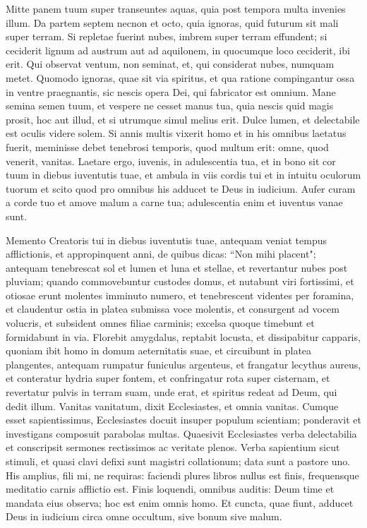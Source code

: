 \begin{biblechapter}  
\verse Mitte panem tuum super transeuntes aquas, quia post tempora multa invenies illum. 
\verse Da partem septem necnon et octo, quia ignoras, quid futurum sit mali super terram. 
\verse Si repletae fuerint nubes, imbrem super terram effundent; si ceciderit lignum ad austrum aut ad aquilonem, in quocumque loco ceciderit, ibi erit. 
\verse Qui observat ventum, non seminat, et, qui considerat nubes, numquam metet. 
\verse Quomodo ignoras, quae sit via spiritus, et qua ratione compingantur ossa in ventre praegnantis, sic nescis opera Dei, qui fabricator est omnium. 
\verse Mane semina semen tuum, et vespere ne cesset manus tua, quia nescis quid magis prosit, hoc aut illud, et si utrumque simul melius erit. 
\verse Dulce lumen, et delectabile est oculis videre solem. 
\verse Si annis multis vixerit homo et in his omnibus laetatus fuerit, meminisse debet tenebrosi temporis, quod multum erit: omne, quod venerit, vanitas. 
\verse Laetare ergo, iuvenis, in adulescentia tua, et in bono sit cor tuum in diebus iuventutis tuae, et ambula in viis cordis tui et in intuitu oculorum tuorum et scito quod pro omnibus his adducet te Deus in iudicium. 
\verse Aufer curam a corde tuo et amove malum a carne tua; adulescentia enim et iuventus vanae sunt. 
\end{biblechapter}

\begin{biblechapter}  
\verse Memento Creatoris tui in diebus iuventutis tuae, antequam veniat tempus afflictionis, et appropinquent anni, de quibus dicas: “Non mihi placent"; 
\verse antequam tenebrescat sol et lumen et luna et stellae, et revertantur nubes post pluviam; 
\verse quando commovebuntur custodes domus, et nutabunt viri fortissimi, et otiosae erunt molentes imminuto numero, et tenebrescent videntes per foramina, 
\verse et claudentur ostia in platea submissa voce molentis, et consurgent ad vocem volucris, et subsident omnes filiae carminis; 
\verse excelsa quoque timebunt et formidabunt in via. Florebit amygdalus, reptabit locusta, et dissipabitur capparis, quoniam ibit homo in domum aeternitatis suae, et circuibunt in platea plangentes, 
\verse antequam rumpatur funiculus argenteus, et frangatur lecythus aureus, et conteratur hydria super fontem, et confringatur rota super cisternam, 
\verse et revertatur pulvis in terram suam, unde erat, et spiritus redeat ad Deum, qui dedit illum. 
\verse Vanitas vanitatum, dixit Ecclesiastes, et omnia vanitas. 
\verse Cumque esset sapientissimus, Ecclesiastes docuit insuper populum scientiam; ponderavit et investigans composuit parabolas multas. 
\verse Quaesivit Ecclesiastes verba delectabilia et conscripsit sermones rectissimos ac veritate plenos. 
\verse Verba sapientium sicut stimuli, et quasi clavi defixi sunt magistri collationum; data sunt a pastore uno. 
\verse His amplius, fili mi, ne requiras: faciendi plures libros nullus est finis, frequensque meditatio carnis afflictio est. 
\verse Finis loquendi, omnibus auditis: Deum time et mandata eius observa; hoc est enim omnis homo. 
\verse Et cuncta, quae fiunt, adducet Deus in iudicium circa omne occultum, sive bonum sive malum.
\end{biblechapter}
